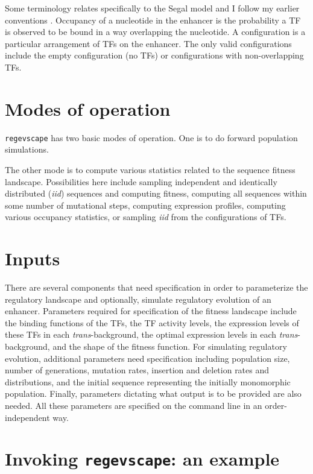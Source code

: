 \documentclass[11pt]{article}
\begin{document}
Some terminology relates specifically to the Segal model and I follow my earlier conventions \cite{KLBullaughey11232010}. Occupancy of a nucleotide in the enhancer is the probability a TF is observed to be bound in a way overlapping the nucleotide. A configuration is a particular arrangement of TFs on the enhancer. The only valid configurations include the empty configuration (no TFs) or configurations with non-overlapping TFs. 

\section*{Modes of operation}

\texttt{regevscape} has two basic modes of operation. One is to do forward population simulations. 

The other mode is to compute various statistics related to the sequence fitness landscape. Possibilities here include sampling independent and identically distributed (\emph{iid}) sequences and computing fitness, computing all sequences within some number of mutational steps, computing expression profiles, computing various occupancy statistics, or sampling \emph{iid} from the configurations of TFs.

\section*{Inputs}

There are several components that need specification in order to parameterize the regulatory landscape and optionally, simulate regulatory evolution of an enhancer. Parameters required for specification of the fitness landscape include the binding functions of the TFs, the TF activity levels, the expression levels of these TFs in each \emph{trans}-background, the optimal expression levels in each \emph{trans}-background, and the shape of the fitness function. For simulating regulatory evolution, additional parameters need specification including population size, number of generations, mutation rates, insertion and deletion rates and distributions, and the initial sequence representing the initially monomorphic population. Finally, parameters dictating what output is to be provided are also needed. All these parameters are specified on the command line in an order-independent way. 

\section*{Invoking \texttt{regevscape}: an example}
\end{document}
